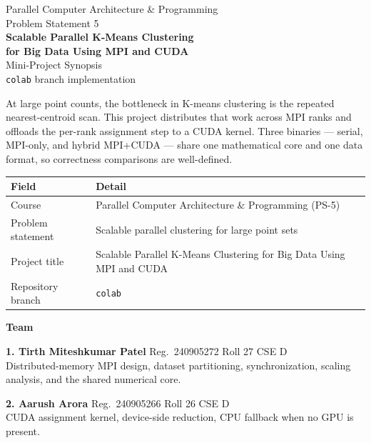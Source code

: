 \documentclass[12pt,a4paper]{article}
\DeclareRobustCommand{\code}[1]{\texttt{#1}}
\begin{document}
\begin{center}
{\large Parallel Computer Architecture \& Programming}\\[0.25em]
{\large Problem Statement 5}\\[1.15em]
{\LARGE\bfseries Scalable Parallel K-Means Clustering\\[0.2em]
for Big Data Using MPI and CUDA}\\[1.05em]
{\Large Mini-Project Synopsis}\\[0.9em]
{\normalsize \code{colab} branch implementation}
\end{center}

\vspace{0.7em}
\noindent
At large point counts, the bottleneck in K-means clustering is the repeated nearest-centroid scan. This project distributes that work across MPI ranks and offloads the per-rank assignment step to a CUDA kernel. Three binaries — serial, MPI-only, and hybrid MPI+CUDA — share one mathematical core and one data format, so correctness comparisons are well-defined.

\vspace{0.85em}
\begin{center}
\renewcommand{\arraystretch}{1.25}
\begin{tabularx}{\textwidth}{@{}l X@{}}
\toprule
\textbf{Field} & \textbf{Detail} \\
\midrule
Course & Parallel Computer Architecture \& Programming (PS-5) \\
Problem statement & Scalable parallel clustering for large point sets \\
Project title & Scalable Parallel K-Means Clustering for Big Data Using MPI and CUDA \\
Repository branch & \code{colab} \\
\bottomrule
\end{tabularx}
\end{center}

\vspace{1.05em}
\noindent\textbf{Team}

\vspace{0.45em}
\noindent\textbf{1. Tirth Miteshkumar Patel} \quad Reg.\ 240905272 \quad Roll 27 \quad CSE D\\
Distributed-memory MPI design, dataset partitioning, synchronization, scaling analysis, and the shared numerical core.

\vspace{0.45em}
\noindent\textbf{2. Aarush Arora} \quad Reg.\ 240905266 \quad Roll 26 \quad CSE D\\
CUDA assignment kernel, device-side reduction, CPU fallback when no GPU is present.
\end{document}
